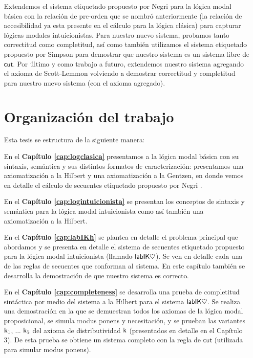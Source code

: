 Extendemos el sistema etiquetado propuesto por Negri para la lógica modal básica \cite{negri2005} con la relación de pre-orden que se nombró anteriormente (la relación de accesibilidad ya esta presente en el cálculo para la lógica clásica) para capturar lógicas modales intuicionistas. Para nuestro nuevo sistema, probamos tanto correctitud como completitud, así como también utilizamos el sistema etiquetado propuesto por Simpson \cite{simpson1994} para demostrar que nuestro sistema es un sistema libre de $\mathsf{cut}$. Por último y como trabajo a futuro, extendemos nuestro sistema agregando el axioma de Scott-Lemmon volviendo a demostrar correctitud y completitud para nuestro nuevo sistema (con el axioma agregado).


\section{Organización del trabajo}

Esta tesis se estructura de la siguiente manera:

En el \textbf{Capítulo \ref{cap:logclasica}} presentamos a la lógica modal básica con su sintaxis, semántica y sus distintos formatos de caracterización: presentamos una axiomatización a la Hilbert y una axiomatización a la Gentzen, en donde vemos en detalle el cálculo de secuentes etiquetado propuesto por Negri \cite{negri2005}.

En el \textbf{Capítulo \ref{cap:logintuicionista}} se presentan los conceptos de sintaxis y semántica para la lógica modal intuicionista como así también una axiomatización a la Hilbert.

En el \textbf{Capítulo \ref{cap:labIKh}} se plantea en detalle el problema principal que abordamos y se presenta en detalle el sistema de secuentes etiquetado propuesto para la lógica modal intuicionista (llamado $\mathsf{labIK\heartsuit}$). Se ven en detalle cada una de las reglas de secuentes que conforman al sistema. En este capítulo también se desarrolla la demostración de que nuestro sistema es correcto.

En el \textbf{Capítulo \ref{cap:completeness}} se desarrolla una prueba de completitud sintáctica por medio del sistema a la Hilbert para el sistema $\mathsf{labIK\heartsuit}$. Se realiza una demostración en la que se demuestran todos los axiomas de la lógica modal proposicional, se simula modus ponens y necesitación, y se prueban las variantes $\mathsf{k}_{1}$, ... $\mathsf{k}_{5}$ del axioma de distributividad $\mathsf{k}$ (presentados en detalle en el Capítulo 3). De esta prueba se obtiene un sistema completo con la regla de $\mathsf{cut}$ (utilizada para simular modus ponens). 

